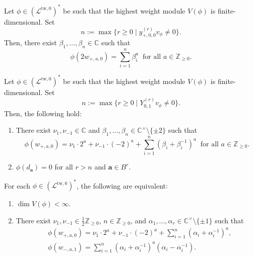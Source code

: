 \documentclass[10pt,a4paper]{amsart}
\begin{document}
\begin{lem}\label{lem: deduction from A1}
  Let $\phi \in (\mathcal{L}^{\mathrm{tw},0})^*$ be such that the highest weight module $V(\phi)$ is finite-dimensional.
  Set
  \[
    n := \max\{ r \geq 0 \mid y_{+,0,0}^{(r)} v_\phi \neq 0 \}.
  \]
  Then, there exist $\beta_1,\dots,\beta_n \in \mathbb{C}$ such that
  \[
    \phi(2w_{+,a,0}) = \sum_{i=1}^n \beta_i^a \ \text{ for all } a \in \mathbb{Z}_{\geq 0}.
  \]
\end{lem}

\begin{lem}\label{lem: deduction from AI1}
  Let $\phi \in (\mathcal{L}^{\mathrm{tw},0})^*$ be such that the highest weight module $V(\phi)$ is finite-dimensional.
  Set
  \[
    n := \max\{ r \geq 0 \mid Y_{0,1}^{(r)} v_\phi \neq 0 \}.
  \]
  Then, the following hold$:$
  \begin{enumerate}
    \item There exist $\nu_1,\nu_{-1} \in \mathbb{C}$ and $\beta_1,\dots,\beta_n \in \mathbb{C}^\times \setminus \{ \pm 2 \}$ such that
    \[
      \phi(w_{+,a,0}) = \nu_1 \cdot 2^a + \nu_{-1} \cdot (-2)^a + \sum_{i=1}^n (\beta_i+\beta_i^{-1})^a \ \text{ for all } a \in \mathbb{Z}_{\geq 0}.
    \]
    \item $\phi(d_\mathbf{a}) = 0$ for all $r > n$ and $\mathbf{a} \in B^r$.
  \end{enumerate}
\end{lem}

\begin{thm}\label{thm: classification AI2}
  For each $\phi \in (\mathcal{L}^{\mathrm{tw},0})^*$, the following are equivalent$:$
  \begin{enumerate}
    \item $\dim V(\phi) < \infty$.
    \item There exist $\nu_1,\nu_{-1} \in \frac{1}{2}\mathbb{Z}_{\geq 0}$, $n \in \mathbb{Z}_{\geq 0}$, and $\alpha_1,\dots,\alpha_r \in \mathbb{C}^\times \setminus \{ \pm 1 \}$ such that
    \begin{align*}
      &\phi(w_{+,a,0}) = \nu_1 \cdot 2^a + \nu_{-1} \cdot (-2)^a + \sum_{i=1}^n (\alpha_i+\alpha_i^{-1})^a,\\
      &\phi(w_{-,a,1}) = \sum_{i=1}^n (\alpha_i+\alpha_i^{-1})^a (\alpha_i-\alpha_i^{-1}).
    \end{align*}
  \end{enumerate}
\end{thm}
\end{document}
